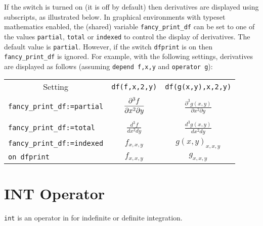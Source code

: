 If the switch  is turned on (it is
off by default) then derivatives are displayed using subscripts, as
illustrated below.  In graphical environments with typeset mathematics
enabled, the (shared) variable
\texttt{fancy\_print\_df} can be set to one
of the values \texttt{partial},
\texttt{total} or \texttt{indexed} to
control the display of derivatives.  The default value is
\texttt{partial}.  However, if the switch \texttt{dfprint} is on then
\texttt{fancy\_print\_df} is ignored.  For example, with the following
settings, derivatives are displayed as follows (assuming
\texttt{depend f,x,y} and \texttt{operator g}):\\[0.5\baselineskip]
\begin{tabular}{lcc}
  \multicolumn{1}{c}{Setting} & \texttt{df(f,x,2,y)} & \texttt{df(g(x,y),x,2,y)} \\[0.2em]
  \texttt{fancy\_print\_df:=partial} &
  \(\displaystyle\frac{\partial^3 f}{\partial x^2 \partial y} \vphantom{\Biggl(} \)&
  \(\displaystyle\frac{\partial^3 g(x,y)}{\partial x^2 \partial y}\) \\
  \texttt{fancy\_print\_df:=total} & \(\displaystyle\frac{d^3 f}{d x^2 d y}\) &
  \(\displaystyle\frac{d^3 g(x,y)}{d x^2 d y}\) \\
  \texttt{fancy\_print\_df:=indexed} & \(f_{x,x,y}\) & \(g(x,y)_{x,x,y}\) \\
  \texttt{on dfprint} & \(f_{x,x,y}\) & \(g_{x,x,y}\)
\end{tabular}

\section{INT Operator}
\hypertarget{operator:INT}{}
\texttt{int} is an operator in {\REDUCE} for indefinite or definite integration.

